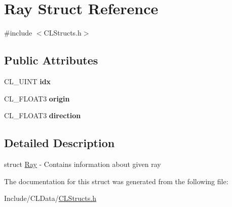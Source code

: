 \hypertarget{struct_ray}{}\section{Ray Struct Reference}
\label{struct_ray}


{\ttfamily \#include $<$C\+L\+Structs.\+h$>$}

\subsection*{Public Attributes}
\begin{DoxyCompactItemize}
\item 
C\+L\+\_\+\+U\+I\+NT {\bfseries idx}\hypertarget{struct_ray_a14ab0eef9ea21e009bbd5b2fbf13ed6c}{}\label{struct_ray_a14ab0eef9ea21e009bbd5b2fbf13ed6c}

\item 
C\+L\+\_\+\+F\+L\+O\+A\+T3 {\bfseries origin}\hypertarget{struct_ray_a9950e112e3a5b9ba0bef0782540934e9}{}\label{struct_ray_a9950e112e3a5b9ba0bef0782540934e9}

\item 
C\+L\+\_\+\+F\+L\+O\+A\+T3 {\bfseries direction}\hypertarget{struct_ray_a7b4fd22121ac9b69d8085920f8f8ef4c}{}\label{struct_ray_a7b4fd22121ac9b69d8085920f8f8ef4c}

\end{DoxyCompactItemize}


\subsection{Detailed Description}
struct \hyperlink{struct_ray}{Ray} -\/ Contains information about given ray 

The documentation for this struct was generated from the following file\+:\begin{DoxyCompactItemize}
\item 
Include/\+C\+L\+Data/\hyperlink{_c_l_structs_8h}{C\+L\+Structs.\+h}\end{DoxyCompactItemize}
